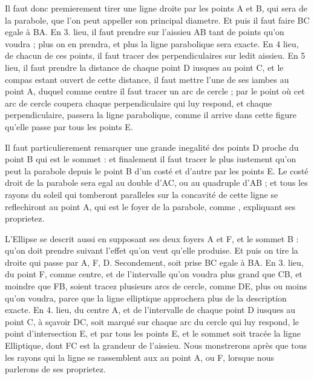 \documentclass[11pt,a4paper]{article}
\begin{document}
Il faut donc premierement tirer une ligne droite par les points A et B, qui sera  de la parabole, que l'on peut appeller son principal diametre. Et puis il faut faire BC egale à BA. En 3. lieu, il faut prendre sur l'aissieu AB tant de points qu'on voudra ; plus on en prendra, et plus la ligne parabolique sera exacte. En 4 lieu, de chacun de ces points, il faut tracer des perpendiculaires sur ledit aissieu. En 5 lieu, il faut prendre la distance de chaque point D iusques au point C, et le compas estant ouvert de cette distance, il faut mettre l'une de ses iambes au point A, duquel comme centre il faut tracer un arc de cercle ; par le point où cet arc de cercle coupera chaque perpendiculaire qui luy respond, et chaque perpendiculaire, passera la ligne parabolique, comme il arrive dans cette figure qu'elle passe par tous les points E.

Il faut particulierement remarquer une grande inegalité des points D proche du point B qui est le sommet : et finalement il faut tracer \struck{\ill{}} le plus iustement qu'on peut la parabole depuis le point B d'un costé et d'autre par les points E. Le costé droit de la parabole sera egal au double d'AC, ou au quadruple d'AB ; et tous les rayons du soleil qui tomberont paralleles sur la concavité de cette ligne se reflechiront au point A, qui est le foyer de la parabole, comme  , \ill{} expliquant ses proprietez.

L'Ellipse se descrit aussi en supposant ses deux foyers A et F, et le sommet B : qu'on doit prendre suivant l'effet qu'on veut qu'elle produise. Et puis on tire la droite qui passe par A, F, D. \struck{\ill{}} Secondement, soit prise BC egale à BA. En 3. lieu, du point F, comme centre, et de l'intervalle qu'on voudra plus grand que CB, et moindre que FB, soient tracez plusieurs arcs de cercle, comme DE, plus ou moins qu'on voudra, parce que la ligne elliptique approchera plus de la description exacte. En 4. lieu, du centre A, et de l'intervalle de chaque point \struck{\ill{}} D iusques au point C, à sçavoir DC, soit marqué sur chaque arc du cercle qui luy respond, le point d'intersection E, et par tous les points E, et le sommet soit tracée la ligne Elliptique, dont FC est la grandeur de l'aissieu. Nous monstrerons après que tous les rayons qui \ill{} la \struck{\ill{}} ligne \struck{\ill{}} se rassemblent \struck{\ill{}} aux  au point A, ou F, lorsque nous parlerons de ses proprietez.
\end{document}
